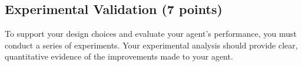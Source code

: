 \documentclass[11pt,a4paper]{report}
\begin{document}
\begin{answers}[23cm]
\end{answers}

\newpage
\subsection{Experimental Validation (7 points)}

To support your design choices and evaluate your agent's performance, you must conduct a series of experiments. Your experimental analysis should provide clear, quantitative evidence of the improvements made to your agent.

\begin{answers}[20cm]
\end{answers}

\begin{answers}[23cm]
\end{answers}

\begin{answers}[23cm]
\end{answers}
\end{document}
